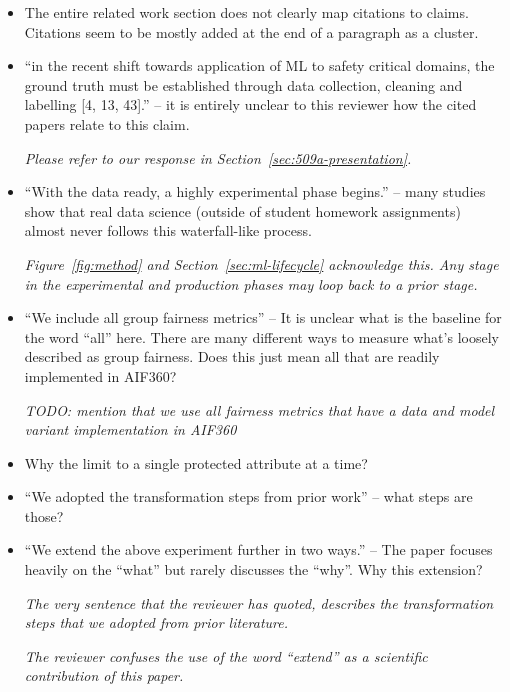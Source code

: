 \documentclass[conference,review,anonymous]{IEEEtran}
\newcommand{\highlight}[1]{\begin{framed}%
  \noindent\emph{#1}
\end{framed}}
\begin{document}
\begin{itemize}
  \item The entire related work section does not clearly map citations
    to claims. Citations seem to be mostly added at the end of
    a paragraph as a cluster.
  \item ``in the recent shift towards application of ML to safety
    critical domains, the ground truth must be established through
    data collection, cleaning and labelling [4, 13, 43].'' -- it is
    entirely unclear to this reviewer how the cited papers relate to
    this claim.

    \highlight{Please refer to our response in Section~\ref{sec:509a-presentation}.}

  \item ``With the data ready, a highly experimental phase begins.''
    -- many studies show that real data science (outside of student
    homework assignments) almost never follows this waterfall-like
    process.

    \highlight{Figure~\ref{fig:method} and
    Section~\ref{sec:ml-lifecycle} acknowledge this. Any stage in the
    experimental and production phases may loop back to a prior
    stage.}

  \item ``We include all group fairness metrics'' -- It is unclear
    what is the baseline for the word ``all'' here. There are many
    different ways to measure what’s loosely described as group
    fairness. Does this just mean all that are readily implemented in
    AIF360?

    \highlight{TODO: mention that we use all fairness metrics that
    have a data and model variant implementation in AIF360}

  \item Why the limit to a single protected attribute at a time?
  \item ``We adopted the transformation steps from prior work'' --
    what steps are those?
  \item ``We extend the above experiment further in two ways.'' -- The
    paper focuses heavily on the ``what'' but rarely discusses the
    “why”. Why this extension?

    \highlight{The very sentence that the reviewer has quoted,
    describes the transformation steps that we adopted from prior
    literature.}

    \highlight{The reviewer confuses the use of the word ``extend''
    as a scientific contribution of this paper.} 


\end{itemize}
\end{document}
